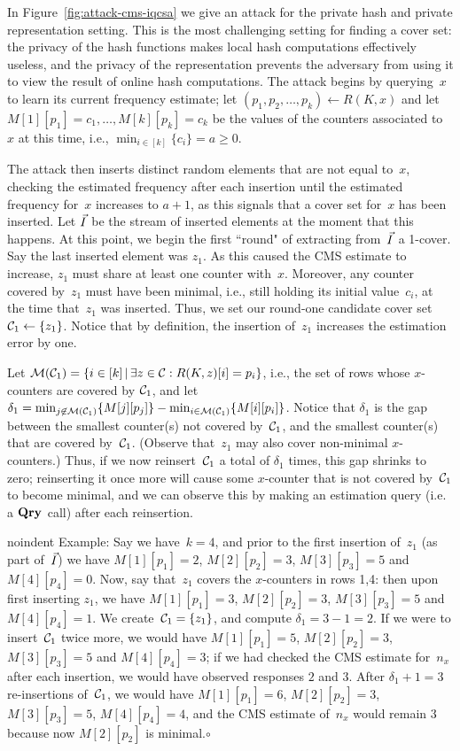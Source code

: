 In Figure~\ref{fig:attack-cms-iqcsa} we give an attack for the private hash and private representation setting.  This is the most challenging setting for finding a cover set: the privacy of the hash functions makes local hash computations effectively useless, and the privacy of the representation prevents the adversary from using it to view the result of online hash computations.  The attack begins by querying~$x$ to learn its current frequency estimate; let $(p_1,p_2,\ldots,p_k) \gets R(K,x)$ and let $M[1][p_1]=c_1,\ldots,M[k][p_k]=c_k$ be the values of the counters associated to~$x$ at this time, i.e., $\min_{i\in[k]}\{c_i\}=a \geq 0$. 

The attack then inserts distinct random elements that are not equal to~$x$, checking the estimated frequency after each insertion until the estimated frequency for~$x$ increases to $a+1$, as this signals that a cover set for~$x$ has been inserted. Let $\vec{I}$ be the stream of inserted elements at the moment that this happens.  At this point, we begin the first ``round" of extracting from~$\vec{I}$ a 1-cover.  Say the last inserted element was $z_1$. As this caused the CMS estimate to increase, $z_1$ must share at least one counter with~$x$.  Moreover, any counter covered by~$z_1$ must have been minimal, i.e., still holding its initial value~$c_i$, at the time that~$z_1$ was inserted.  Thus, we set our round-one candidate cover set~$\mathcal{C}_1\gets\{z_1\}$.  Notice that by definition, the insertion of~$z_1$ increases the estimation error by one.

Let $\mathcal{M}(\mathcal{C}_1)=\{i \in [k] \,|\, \exists z \in \mathcal{C}: R(K,z)[i]=p_i\}$, i.e., the set of rows whose $x$-counters are covered by $\mathcal{C}_1$, and let $\delta_1 = \min_{j \not\in \mathcal{M}(\mathcal{C}_1)}\{M[j][p_j]\} - \min_{i \in \mathcal{M}(\mathcal{C}_1)}\{M[i][p_i]\}$.  Notice that $\delta_1$ is the gap between the smallest counter(s) not covered by~$\mathcal{C}_1$, and the smallest counter(s) that are covered by~$\mathcal{C}_1$.  (Observe that~$z_1$ may also cover non-minimal $x$-counters.)  Thus, if we now reinsert~$\mathcal{C}_1$ a total of $\delta_1$ times, this gap shrinks to zero; reinserting it once more will cause some $x$-counter that is not covered by~$\mathcal{C}_1$ to become minimal, and we can observe this by making an estimation query (i.e. a $\textup{\textbf{Qry}}\hspace{0.5pt}$ call) after each reinsertion.  

noindent Example: Say we have~$k=4$, and prior to the first insertion of~$z_1$ (as part of~$\vec{I}$) we have $M[1][p_1]=2$, $M[2][p_2]=3$, $M[3][p_3]=5$ and $M[4][p_4]=0$. Now, say that~$z_1$ covers the $x$-counters in rows 1,4: then upon first inserting $z_1$, we have $M[1][p_1]=3$, $M[2][p_2]=3$, $M[3][p_3]=5$ and $M[4][p_4]=1$.  We create~$\mathcal{C}_1=\{z_1\}$, and compute $\delta_1 = 3-1=2$.  If we were to insert~$\mathcal{C}_1$ twice more, we would have $M[1][p_1]=5$, $M[2][p_2]=3$, $M[3][p_3]=5$ and $M[4][p_4]=3$; if we had checked the CMS estimate for~$n_x$ after each insertion, we would have observed responses $2$ and $3$.  After $\delta_1+1=3$ re-insertions of~$\mathcal{C}_1$, we would have $M[1][p_1]=6$, $M[2][p_2]=3$, $M[3][p_3]=5$, $M[4][p_4]=4$, and the CMS estimate of~$n_x$ would remain $3$ because now $M[2][p_2]$ is minimal.\hfill$\circ$


